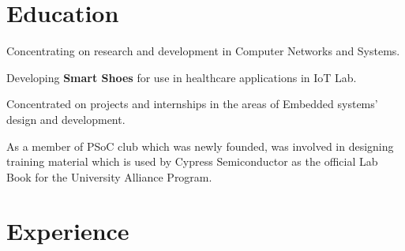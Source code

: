 \documentclass[letterpaper]{deedy-resume} %
\begin{document}
\begin{minipage}[t]{0.74\textwidth} %


\section{Education}

\vspace{\topsep} %
\begin{tightitemize}
\item Concentrating on research and development in Computer Networks and Systems.
\item Developing \textbf{Smart Shoes} for use in healthcare applications in IoT Lab.
\end{tightitemize}

\sectionspace %

\begin{tightitemize}
\item Concentrated on projects and internships in the areas of Embedded systems' design and development.
\item As a member of PSoC club which was newly founded, was involved in designing training material which is used by Cypress Semiconductor as the official Lab Book for the University Alliance Program.
\end{tightitemize}

\sectionspace %



\section{Experience}



\end{minipage}
\end{document}
